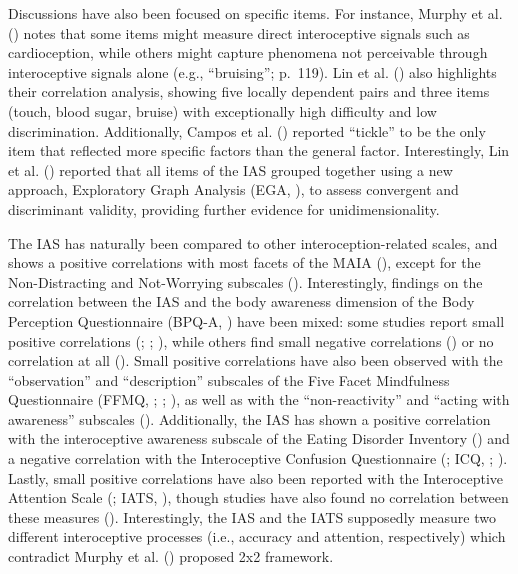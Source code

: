 \documentclass[
  man,
  floatsintext,
  longtable,
  nolmodern,
  notxfonts,
  notimes,
  colorlinks=true,linkcolor=blue,citecolor=blue,urlcolor=blue]{apa7}
\begin{document}
Discussions have also been focused on specific items. For instance,
Murphy et al. () notes that some items
might measure direct interoceptive signals such as cardioception, while
others might capture phenomena not perceivable through interoceptive
signals alone (e.g., ``bruising''; p.~119). Lin et al.
() also highlights their correlation
analysis, showing five locally dependent pairs and three items (touch,
blood sugar, bruise) with exceptionally high difficulty and low
discrimination. Additionally, Campos et al.
() reported ``tickle'' to be the only
item that reflected more specific factors than the general factor.
Interestingly, Lin et al. () reported that
all items of the IAS grouped together using a new approach, Exploratory
Graph Analysis (EGA, ), to assess convergent and discriminant validity,
providing further evidence for unidimensionality.

The IAS has naturally been compared to other interoception-related
scales, and shows a positive correlations with most facets of the MAIA
(),
except for the Non-Distracting and Not-Worrying subscales
(). Interestingly, findings
on the correlation between the IAS and the body awareness dimension of
the Body Perception Questionnaire (BPQ-A,
) have been mixed: some
studies report small positive correlations
(;
;
), while others find
small negative correlations ()
or no correlation at all (). Small positive correlations have also been observed with the
``observation'' and ``description'' subscales of the Five Facet
Mindfulness Questionnaire (FFMQ, ; ;
), as well as with the
``non-reactivity'' and ``acting with awareness'' subscales
(). Additionally, the IAS
has shown a positive correlation with the interoceptive awareness
subscale of the Eating Disorder Inventory () and a negative correlation with the Interoceptive Confusion
Questionnaire (; ICQ,
;
). Lastly, small positive
correlations have also been reported with the Interoceptive Attention
Scale (; IATS,
), though studies have also
found no correlation between these measures
().
Interestingly, the IAS and the IATS supposedly measure two different
interoceptive processes (i.e., accuracy and attention, respectively)
which contradict Murphy et al. ()
proposed 2x2 framework.
\end{document}
